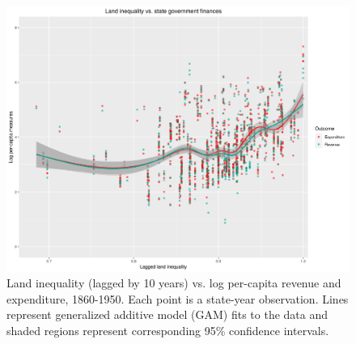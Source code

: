 \documentclass[12pt]{article}
\begin{document}
\begin{figure}[htbp]
	\begin{center}
		\includegraphics[width=1\textwidth]{plots/ineq-capacity.png} 
	\end{center}
	\caption{Land inequality (lagged by 10 years) vs. log per-capita revenue and expenditure, 1860-1950. Each point is a state-year observation. Lines represent generalized additive model (GAM) fits to the data and shaded regions represent corresponding 95\% confidence intervals.   \label{fig:ineq-capacity}}
\end{figure} 

%
%
%


\itemize
\end{document}

